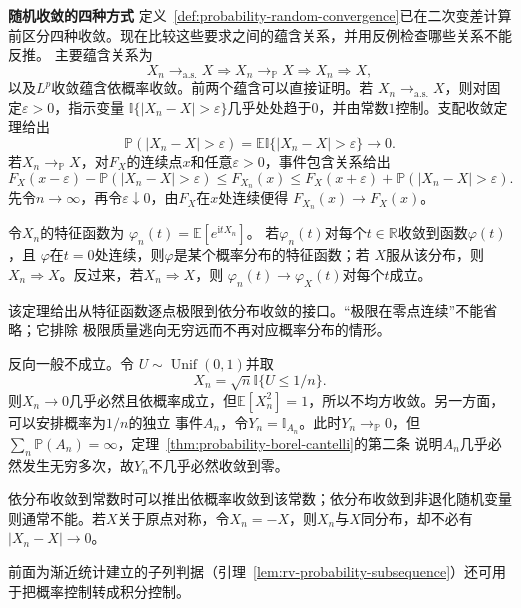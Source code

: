 \par\medskip\noindent\textbf{随机收敛的四种方式}\quad
定义~\ref{def:probability-random-convergence}已在二次变差计算前区分四种收敛。现在比较这些要求之间的蕴含关系，并用反例检查哪些关系不能反推。
主要蕴含关系为
\[ X_n\to_{\mathrm{a.s.}}X
  \Longrightarrow X_n\to_{\mathbb{P}}X\Longrightarrow X_n\Rightarrow X, \]
以及\(L^p\)收敛蕴含依概率收敛。前两个蕴含可以直接证明。若
\(X_n\to_{\mathrm{a.s.}}X\)，则对固定\(\varepsilon>0\)，指示变量
\(\mathbb{I}\{|X_n-X|>\varepsilon\}\)几乎处处趋于\(0\)，并由常数\(1\)控制。支配收敛定理给出
\[
  \mathbb{P}(|X_n-X|>\varepsilon)
  =\mathbb{E}\mathbb{I}\{|X_n-X|>\varepsilon\}\to0.
\]
若\(X_n\to_{\mathbb{P}}X\)，对\(F_X\)的连续点\(x\)和任意\(\varepsilon>0\)，事件包含关系给出
\[
  F_X(x-\varepsilon)-\mathbb{P}(|X_n-X|>\varepsilon)
  \leq F_{X_n}(x)
  \leq
  F_X(x+\varepsilon)+\mathbb{P}(|X_n-X|>\varepsilon).
\]
先令\(n\to\infty\)，再令\(\varepsilon\downarrow0\)，由\(F_X\)在\(x\)处连续便得
\(F_{X_n}(x)\to F_X(x)\)。

\begin{theorem}[L\'evy连续性定理]
  \label{thm:probability-levy-continuity}
  令\(X_n\)的特征函数为
  \(\varphi_n(t)=\mathbb{E}[e^{\mathrm{i}tX_n}]\)。
  若\(\varphi_n(t)\)对每个\(t\in\mathbb{R}\)收敛到函数\(\varphi(t)\)，且
  \(\varphi\)在\(t=0\)处连续，则\(\varphi\)是某个概率分布的特征函数；若
  \(X\)服从该分布，则\(X_n\Rightarrow X\)。反过来，若\(X_n\Rightarrow X\)，则
  \(\varphi_n(t)\to\varphi_X(t)\)对每个\(t\)成立。
\end{theorem}

该定理给出从特征函数逐点极限到依分布收敛的接口。“极限在零点连续”不能省略；它排除
极限质量逃向无穷远而不再对应概率分布的情形。

反向一般不成立。令
\(U\sim\operatorname{Unif}(0,1)\)并取
\[ X_n=\sqrt{n}\mathbb{I}\{U\leq1/n\}. \]
则\(X_n\to0\)几乎必然且依概率成立，但\(\mathbb{E}[X_n^2]=1\)，所以不均方收敛。另一方面，可以安排概率为\(1/n\)的独立
事件\(A_n\)，令\(Y_n=\mathbb{I}_{A_n}\)。此时\(Y_n\to_{\mathbb{P}}0\)，但
\(\sum_n\mathbb{P}(A_n)=\infty\)，定理~\ref{thm:probability-borel-cantelli}的第二条
说明\(A_n\)几乎必然发生无穷多次，故\(Y_n\)不几乎必然收敛到零。

依分布收敛到常数时可以推出依概率收敛到该常数；依分布收敛到非退化随机变量则通常不能。若\(X\)关于原点对称，令\(X_n=-X\)，则\(X_n\)与\(X\)同分布，却不必有\(|X_n-X|\to0\)。

前面为渐近统计建立的子列判据（引理~\ref{lem:rv-probability-subsequence}）还可用于把概率控制转成积分控制。



